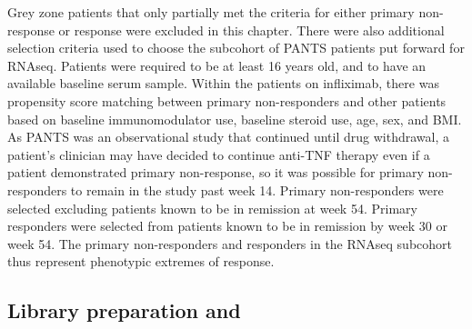 %
Grey zone patients that only partially met the criteria for either primary non-response or response were excluded in this chapter.
There were also additional selection criteria used to choose the subcohort of \gls{PANTS} patients put forward for \gls{RNAseq}.
Patients were required to be at least 16 years old, and to have an available baseline serum sample.
Within the patients on infliximab, there was propensity score matching between primary non-responders and other patients based on baseline immunomodulator use, baseline steroid use, age, sex, and \gls{BMI}.
As \gls{PANTS} was an observational study that continued until drug withdrawal, a patient's clinician may have decided to continue anti-\gls{TNF} therapy even if a patient demonstrated primary non-response, so it was possible for primary non-responders to remain in the study past week 14.
Primary non-responders were selected excluding patients known to be in remission at week 54.
Primary responders were selected from patients known to be in remission by week 30 or week 54.
The primary non-responders and responders in the \gls{RNAseq} subcohort thus represent phenotypic extremes of response.

\subsection{Library preparation and }

